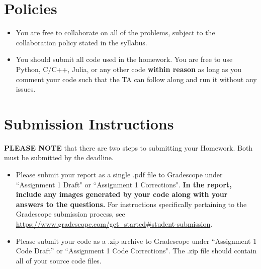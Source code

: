\newif\ifshowsolutions
\showsolutionsfalse




\pagestyle{fancy}

\section*{Policies}
\begin{itemize}
  \item You are free to collaborate on all of the problems, subject to the collaboration policy stated in the syllabus.
  \item You should submit all code used in the homework.
        You are free to use Python, C/C++, Julia, or any other code \textbf{within reason} as long as you comment your code such that the TA can follow along and run it without any issues.
\end{itemize}

\section*{Submission Instructions}
\textbf{PLEASE NOTE} that there are two steps to submitting your Homework.
Both must be submitted by the deadline.

\begin{itemize}
  \item Please submit your report as a single .pdf file to Gradescope under ``Assignment 1 Draft" or ``Assignment 1 Corrections".
        \textbf{In the report, include any images generated by your code along with your answers to the questions.}
        For instructions specifically pertaining to the Gradescope submission process, see \url{https://www.gradescope.com/get_started#student-submission}.
  \item Please submit your code as a .zip archive to Gradescope under ``Assignment 1 Code Draft'' or ``Assignment 1 Code Corrections".
        The .zip file should contain all of your source code files.
\end{itemize}

